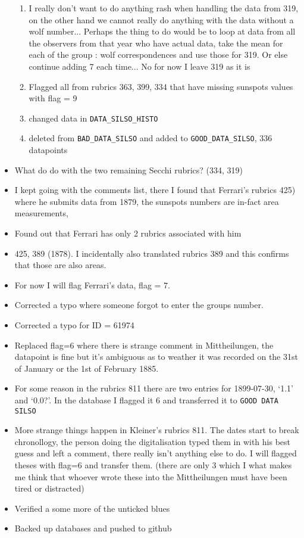 \documentclass[12pt]{article}
\begin{document}
\begin{itemize}
\begin{enumerate}
        \item I really don't want to do anything rash when handling the data from 319, on the other hand we cannot really do anything with the data without a wolf number... Perhaps the thing to do would be to loop at data from all the observers from that year who have actual data, take the mean for each of the group : wolf correspondences and use those for 319. Or else continue adding 7 each time... No for now I leave 319 as it is
        \item Flagged all from rubrics 363, 399, 334 that have missing sunspots values with flag = 9
        \item changed data in \texttt{DATA\_SILSO\_HISTO}
        \item deleted from \texttt{BAD\_DATA\_SILSO} and added to \texttt{GOOD\_DATA\_SILSO}, 336 datapoints
    \end{enumerate}
    \item What do do with the two remaining Secchi rubrics? (334, 319)
    \item I kept going with the comments list, there I found that Ferrari's rubrics 425) where he submits data from 1879, the sunspots numbers are in-fact area measurements, 
    \item Found out that Ferrari has only 2 rubrics associated with him
    \item 425, 389 (1878). I incidentally also translated rubrics 389 and this confirms that those are also areas. 
    \item For now I will flag Ferrari's data, flag = 7. 
    \item Corrected a typo where someone forgot to enter the groups number.
    \item Corrected a typo for ID = 61974
    \item Replaced flag=6 where there is strange comment in Mittheilungen, the datapoint is fine but it's ambiguous as to weather it was recorded on the 31st of January or the 1st of February 1885.
    \item For some reason in the rubrics 811 there are two entries for 1899-07-30, `1.1' and `0.0?'. In the database I flagged it 6 and transferred it to \texttt{GOOD DATA SILSO}
    \item More strange things happen in Kleiner's rubrics 811. The dates start to break chronollogy, the person doing the digitalisation typed them in with his best guess and left a comment, there really isn't anything else to do. I will flagged theses with flag=6 and transfer them. (there are only 3 which I what makes me think that whoever wrote these into the Mittheilungen must have been tired or distracted)
    \item Verified a some more of the unticked blues
    \item Backed up databases and pushed to github
\end{itemize}
\end{document}
